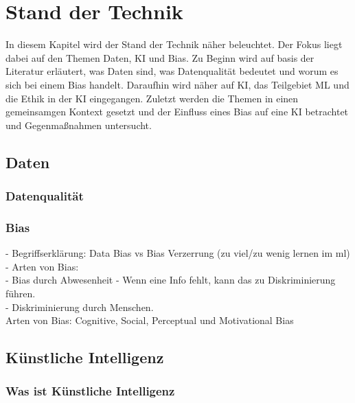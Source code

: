 \chapter{Stand der Technik}
    \begin{onehalfspace}  
        \label{sec:theorie/standdertechnik}
            In diesem Kapitel wird der Stand der Technik näher beleuchtet. Der Fokus liegt dabei auf den Themen Daten, \ac*{KI} und Bias. Zu Beginn wird auf basis der Literatur erläutert, was Daten sind, was Datenqualität bedeutet und worum es sich bei einem Bias handelt. Daraufhin wird näher auf \ac*{KI}, das Teilgebiet \ac*{ML} und die Ethik in der \ac*{KI} eingegangen. Zuletzt werden die Themen in einen gemeinsamgen Kontext gesetzt und der Einfluss eines Bias auf eine \ac*{KI} betrachtet und Gegenmaßnahmen untersucht. 
        
        \section{Daten}
        \label{subsec:daten}
        
        \subsection{Datenqualität}
        \label{subsubsec:datenqualität}

        \subsection{Bias}
        \label{subsubsec:Bias}
            -   Begriffserklärung: Data Bias vs Bias Verzerrung (zu viel/zu wenig lernen im ml)\\
            -   Arten von Bias: \\
                -   Bias durch Abwesenheit - Wenn eine Info fehlt, kann das zu Diskriminierung führen. \\
                -   Diskriminierung durch Menschen. \\
            Arten von Bias: Cognitive, Social, Perceptual und Motivational Bias \cite{Bias}
 
        \section{Künstliche Intelligenz}
        \label{subsec:KIandML}

        \subsection{Was ist Künstliche Intelligenz}
        \label{subsec:wasistKI}


\end{onehalfspace}
